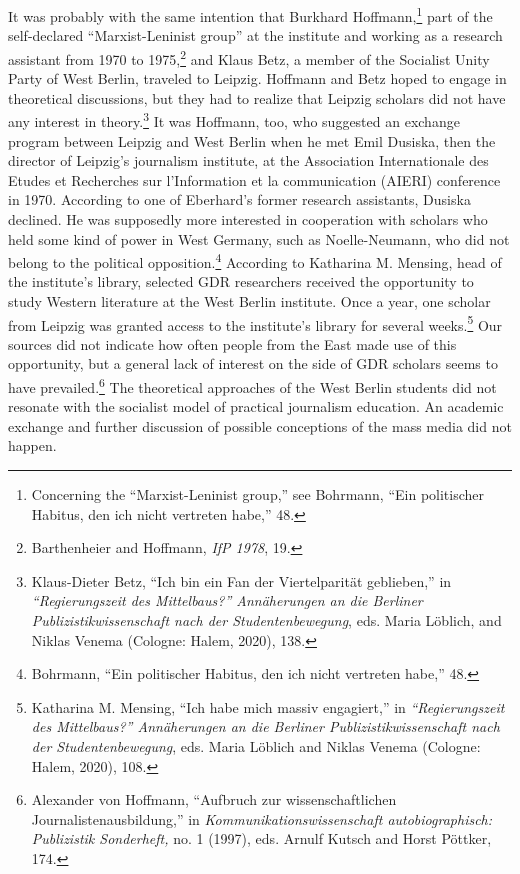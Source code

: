 \documentclass{tufte-handout}
\begin{document}
It was probably with the same intention that Burkhard
Hoffmann,\footnote{Concerning the ``Marxist-Leninist group,'' see
  Bohrmann, ``Ein politischer Habitus, den ich nicht vertreten habe,''
  48.} part of the self-declared ``Marxist-Leninist group'' at the
institute and working as a research assistant from 1970 to
1975,\footnote{Barthenheier and Hoffmann, \emph{IfP 1978}, 19.} and
Klaus Betz, a member of the Socialist Unity Party of West Berlin,
traveled to Leipzig. Hoffmann and Betz hoped to engage in theoretical
discussions, but they had to realize that Leipzig scholars did not have
any interest in theory.\footnote{Klaus-Dieter Betz, ``Ich bin ein Fan
  der Viertelparität geblieben,'' in \emph{``Regierungszeit des
  Mittelbaus?'' Annäherungen an die Berliner Publizistikwissenschaft
  nach der Studentenbewegung}, eds. Maria Löblich, and Niklas Venema
  (Cologne: Halem, 2020), 138.} It was Hoffmann, too, who suggested an
exchange program between Leipzig and West Berlin when he met Emil
Dusiska, then the director of Leipzig's journalism institute, at the
Association Internationale des Etudes et Recherches sur l'Information et
la communication (AIERI) conference in 1970. According to one of
Eberhard's former research assistants, Dusiska declined. He was
supposedly more interested in cooperation with scholars who held some
kind of power in West Germany, such as Noelle-Neumann, who did not
belong to the political opposition.\footnote{Bohrmann, ``Ein politischer
  Habitus, den ich nicht vertreten habe,'' 48.} According to Katharina
M. Mensing, head of the institute's library, selected GDR researchers
received the opportunity to study Western literature at the West Berlin
institute. Once a year, one scholar from Leipzig was granted access to
the institute's library for several weeks.\footnote{Katharina M.
  Mensing, ``Ich habe mich massiv engagiert,'' in \emph{``Regierungszeit
  des Mittelbaus?'' Annäherungen an die Berliner Publizistikwissenschaft
  nach der Studentenbewegung}, eds. Maria Löblich and Niklas Venema
  (Cologne: Halem, 2020), 108.} Our sources did not indicate how often
people from the East made use of this opportunity, but a general lack of
interest on the side of GDR scholars seems to have prevailed.\footnote{Alexander
  von Hoffmann, ``Aufbruch zur wissenschaftlichen
  Journalistenausbildung,'' in \emph{Kommunikationswissenschaft
  autobiographisch: Publizistik Sonderheft,} no. 1 (1997), eds. Arnulf
  Kutsch and Horst Pöttker, 174.} The theoretical approaches of the West
Berlin students did not resonate with the socialist model of practical
journalism education. An academic exchange and further discussion of
possible conceptions of the mass media did not happen.
\end{document}
